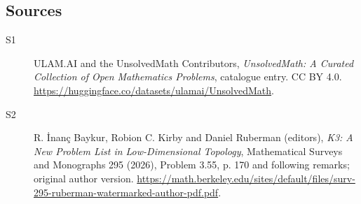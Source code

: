 \documentclass[11pt]{article}
\begin{document}
\subsection{Sources}
\begin{description}
\item[\hypertarget{source:statement:1}{S1}] ULAM.AI and the UnsolvedMath Contributors, \emph{UnsolvedMath: A Curated Collection of Open Mathematics Problems}, catalogue entry. CC BY 4.0. \url{https://huggingface.co/datasets/ulamai/UnsolvedMath}.
\item[\hypertarget{source:statement:2}{S2}] R. İnanç Baykur, Robion C. Kirby and Daniel Ruberman (editors), \emph{K3: A New Problem List in Low-Dimensional Topology}, Mathematical Surveys and Monographs 295 (2026), Problem 3.55, p. 170 and following remarks; original author version. \url{https://math.berkeley.edu/sites/default/files/surv-295-ruberman-watermarked-author-pdf.pdf}.
\end{description}
\label{end:statement}
\end{document}

